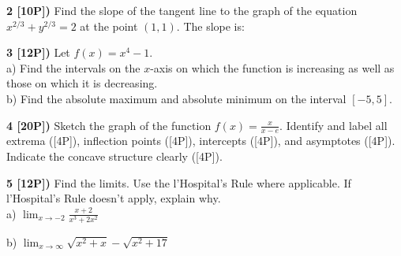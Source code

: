 \documentclass[12pt]{article}
\begin{document}
{\bf 2 [10P])} 
Find the slope of the tangent line to the graph
of the equation 
$\displaystyle{x^{2/3}+y^{2/3}=2}$
at the point $(1,1)$.
The slope is: %

\vspace{2.3in}

 

{\bf 3 [12P])} Let $\displaystyle{f(x) = x^4-1}$.\\
a) Find the intervals on the $x$-axis on which the function is 
increasing as
well as those on which it is decreasing.
\\ 
b) Find the absolute maximum and absolute minimum on the interval
$[-5,5]$.
\\ 





\vspace{3in}

{\bf 4 [20P])} Sketch the graph of the function
${\displaystyle f(x) = \frac{x}{x- e}}$. Identify and label all
extrema ([4P]), inflection points ([4P]), intercepts
([4P]), and asymptotes ([4P]). Indicate the concave structure
clearly ([4P]).

\newpage

{\bf 5 [12P])}  Find the  
limits. Use the l'Hospital's Rule where applicable. If l'Hospital's Rule doesn't
apply, explain why.  
\\ 
a) $\displaystyle{\lim_{x\to -2} \frac{x+2}{x^3+2x^2} }$

\vspace{.5in}

b) $\displaystyle{\lim_{x\to \infty} \sqrt{x^2+x}-\sqrt{ x^2+17}
}$
\end{document}
